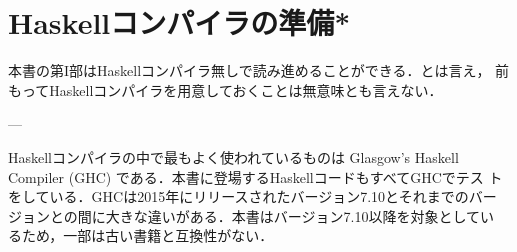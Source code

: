 \documentclass[a5paper,twoside,fleqn,draft]{jsbook}
\newcommand{\programminglanguage}[1]{\textsf{#1}}
\newcommand{\clang}{\programminglanguage{C}}
\newcommand{\clangkr}{\programminglanguage{K\&R~C}}
\newcommand{\haskell}{\programminglanguage{Haskell}}
\newcommand{\code}[1]{\texttt{#1}}
\newenvironment{ccode}{\begin{itembox}[r]{\clang}}{\end{itembox}}
\newenvironment{ckrcode}{\begin{itembox}[r]{\clangkr}}{\end{itembox}}
\begin{document}



\section{\haskell コンパイラの準備*}

本書の第I部は\haskell コンパイラ無しで読み進めることができる．とは言え，
前もって\haskell コンパイラを用意しておくことは無意味とも言えない．

---

\haskell コンパイラの中で最もよく使われているものは Glasgow's Haskell
Compiler (GHC) である．本書に登場する\haskell コードもすべてGHCでテス
トをしている．GHCは2015年にリリースされたバージョン7.10とそれまでのバー
ジョンとの間に大きな違いがある．本書はバージョン7.10以降を対象としてい
るため，一部は古い書籍と互換性がない．
\end{document}

